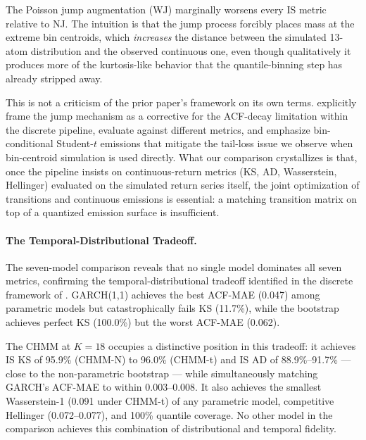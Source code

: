 The Poisson jump augmentation (WJ) marginally worsens every IS metric relative to NJ.
The intuition is that the jump process forcibly places mass at the extreme bin centroids, which \emph{increases} the distance between the simulated 13-atom distribution and the observed continuous one, even though qualitatively it produces more of the kurtosis-like behavior that the quantile-binning step has already stripped away.

This is not a criticism of the prior paper's framework on its own terms.
\citet{alswaidan2026hybrid} explicitly frame the jump mechanism as a corrective for the ACF-decay limitation within the discrete pipeline, evaluate against different metrics, and emphasize bin-conditional Student-$t$ emissions that mitigate the tail-loss issue we observe when bin-centroid simulation is used directly.
What our comparison crystallizes is that, once the pipeline insists on continuous-return metrics (KS, AD, Wasserstein, Hellinger) evaluated on the simulated return series itself, the joint optimization of transitions and continuous emissions is essential: a matching transition matrix on top of a quantized emission surface is insufficient.

\paragraph{The Temporal-Distributional Tradeoff.}
The seven-model comparison reveals that no single model dominates all seven metrics, confirming the temporal-distributional tradeoff identified in the discrete framework of \citet{alswaidan2026hybrid}.
GARCH(1,1) achieves the best ACF-MAE (0.047) among parametric models but catastrophically fails KS (11.7\%), while the bootstrap achieves perfect KS (100.0\%) but the worst ACF-MAE (0.062).

The CHMM at $K = 18$ occupies a distinctive position in this tradeoff: it achieves IS KS of 95.9\% (CHMM-N) to 96.0\% (CHMM-t) and IS AD of 88.9\%--91.7\% --- close to the non-parametric bootstrap --- while simultaneously matching GARCH's ACF-MAE to within 0.003--0.008.
It also achieves the smallest Wasserstein-1 (0.091 under CHMM-t) of any parametric model, competitive Hellinger (0.072--0.077), and 100\% quantile coverage.
No other model in the comparison achieves this combination of distributional and temporal fidelity.

